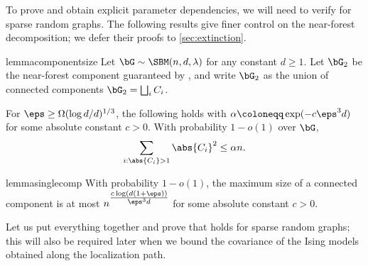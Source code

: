\documentclass[11pt,letterpaper]{article}
\begin{document}
To prove  and obtain explicit parameter dependencies, we will need to verify  for sparse random graphs. 
The following results give finer control on the near-forest decomposition; we defer their proofs to \cref{sec:extinction}.
\begin{restatable}{lemma}{componentsize}\label{lem:component-size}
    Let $\bG\sim\SBM(n, d, \lambda)$ for any constant $d\ge 1$. Let $\bG_2$ be the near-forest component guaranteed by , and write $\bG_2$ as the union of connected components $\bG_2 = \bigsqcup_{i} C_i$.

    For $\eps \ge \Omega(\log d/d)^{1/3}$, the following holds with $\alpha \coloneqq \exp(-c\eps^3 d)$ for some absolute constant $c > 0$.
    With probability $1 - o(1)$ over $\bG$, 
    \[
        \sum_{i: \abs{C_i} > 1} \abs{C_i}^2 \le \alpha n.
    \]
\end{restatable}

\begin{restatable}{lemma}{singlecomp}\label{lem:single-component-bound}
    With probability $1-o(1)$, the maximum size of a connected component is at most $n^{\tfrac{c\log(d(1+\eps))}{\eps^3 d}}$ for some absolute constant $c > 0$.
\end{restatable}

Let us put everything together and prove that  holds for sparse random graphs; this will also be required later when we bound the covariance of the Ising models obtained along the localization path.
\end{document}
